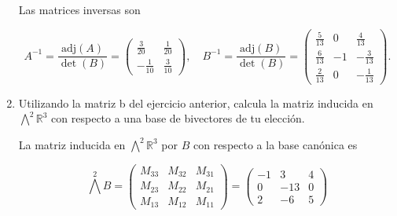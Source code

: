 \documentclass[letterpaper]{article}
\theoremstyle{definition}
\theoremstyle{lemathm}
\theoremstyle{lemademthm}
\newcommand{\R}{\mathbb{R}}
\begin{document}
\begin{enumerate}
		Las matrices inversas son

		\[A^{-1} = \frac{\text{adj}(A)}{\det(B)} =  \begin{pmatrix}
			\frac{3}{20} & \frac{1}{20}\\[1ex]
			-\frac{1}{10} & \frac{3}{10}
		\end{pmatrix}, \quad B^{-1} = \frac{\text{adj}(B)}{\det(B)} = \begin{pmatrix}
			\frac{5}{13} & 0 & \frac{4}{13}\\[1ex]
			\frac{6}{13} & -1 & -\frac{3}{13}\\[1ex]
			\frac{2}{13} & 0 & -\frac{1}{13}
		\end{pmatrix}.\]

		\item Utilizando la matriz b del ejercicio anterior, calcula la matriz inducida en ${\bigwedge}^2\R^3$ con respecto a una base de bivectores de tu elección.
		
		La matriz inducida en ${\bigwedge}^2\R^3$ por $B$ con respecto a la base canónica es

		\[{\bigwedge}^2B = \begin{pmatrix}
			M_{33} & M_{32} & M_{31}\\[1ex]
			M_{23} & M_{22} & M_{21}\\[1ex]
			M_{13} & M_{12} & M_{11}
		\end{pmatrix} = \begin{pmatrix}
			-1 & 3 & 4\\[1ex]
			0 & -13 & 0\\[1ex]
			2 & -6 & 5
		\end{pmatrix}\]

	\end{enumerate}

	
\end{document}
